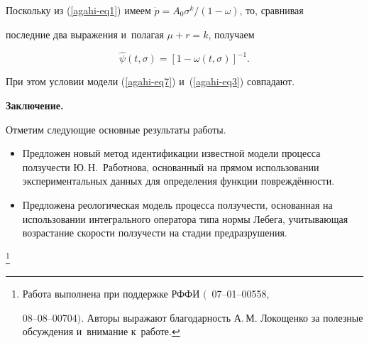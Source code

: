 Поскольку из (\ref{agahi-eq1}) имеем $\dot {p}={A_0 \sigma ^k}/({1-\omega })$, то, сравнивая

последние два выражения и~полагая $\mu +r=k$, получаем

\[

\hat {\psi }(t,\sigma )=[{1-\omega (t,\sigma )}]^{-1}.

\]

При этом условии модели (\ref{agahi-eq7}) и~(\ref{agahi-eq3}) совпадают.



\textbf{Заключение.}

Отметим следующие основные результаты работы.

\begin{itemize}

\item[1.] Предложен новый метод идентификации известной модели процесса ползучести Ю.\,Н.~Работнова, основанный на прямом использовании экспериментальных данных для определения функции повреждённости.

\item[2.] Предложена реологическая модель процесса ползучести, основанная на использовании интегрального оператора типа нормы Лебега, учитывающая возрастание скорости ползучести на стадии предразрушения.

\end{itemize}



{\thanks{Работа выполнена при поддержке РФФИ $($\No\No~07--01--00558,

08--08--00704$)$. Авторы выражают благодарность А.\,М. Локощенко за полезные обсуждения и~внимание к~работе.}}









